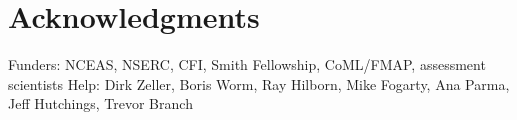 \documentclass[letterpaper,12pt]{article}
\begin{document}
\section*{Acknowledgments }
Funders: NCEAS, NSERC, CFI, Smith Fellowship, CoML/FMAP, assessment scientists 
Help: Dirk Zeller, Boris Worm, Ray Hilborn, Mike Fogarty, Ana Parma, Jeff Hutchings, Trevor Branch

\newpage
%
%




\appendix



\end{document}
